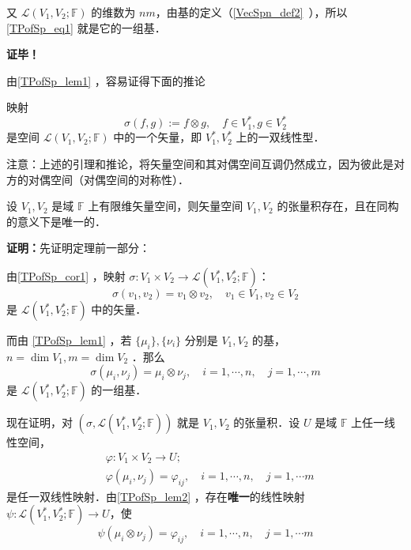 又 $\mathcal L(V_1,V_2;\mathbb F)$ 的维数为 $nm$，由基的定义（\autoref{VecSpn_def2}~），所以\autoref{TPofSp_eq1} 就是它的一组基．

\textbf{证毕！}

由\autoref{TPofSp_lem1} ，容易证得下面的推论
\begin{corollary}{}\label{TPofSp_cor1}
映射
\begin{equation}
\sigma(f,g):=f\otimes g,\quad f\in V_1^*,g\in V_2^*
\end{equation}
是空间 $\mathcal L(V_1,V_2;\mathbb F)$ 中的一个矢量，即 $V_1^*,V_2^*$ 上的一双线性型．
\end{corollary}
注意：上述的引理和推论，将矢量空间和其对偶空间互调仍然成立，因为彼此是对方的对偶空间（对偶空间的对称性）．

\begin{theorem}{}
设 $V_1,V_2$ 是域 $\mathbb F$ 上有限维矢量空间，则矢量空间 $V_1,V_2$ 的张量积存在，且在同构的意义下是唯一的．
\end{theorem}
\textbf{证明：}先证明定理前一部分：

由\autoref{TPofSp_cor1} ，映射 $\sigma:V_1\times V_2\rightarrow\mathcal L(V_1^*,V_2^*;\mathbb F) $：
\begin{equation}\label{TPofSp_eq7}
\sigma(v_1,v_2)=v_1\otimes v_2,\quad v_1\in V_1,v_2\in V_2 
\end{equation}
是  $\mathcal L(V_1^*,V_2^*;\mathbb F)$ 中的矢量．

而由 \autoref{TPofSp_lem1} ，若 $\{\mu_i\},\{\nu_i\}$ 分别是 $V_1,V_2$ 的基，$n=\dim V_1,m=\dim V_2$ ．那么
\begin{equation}\label{TPofSp_eq2}
\sigma(\mu_i,\nu_j)=\mu_i\otimes \nu_j,\quad i=1,\cdots,n,\quad j=1,\cdots,m
\end{equation}
是 $\mathcal L(V_1^*,V_2^*;\mathbb F)$ 的一组基．

现在证明，对 $(\sigma,\mathcal L(V_1^*,V_2^*;\mathbb F))$ 就是 $V_1,V_2$ 的张量积．设 $U$ 是域 $\mathbb F$ 上任一线性空间，
\begin{equation}\label{TPofSp_eq3}
\begin{aligned}
&\varphi:V_1\times V_2\rightarrow U;\\
&\varphi(\mu_i,\nu_j)=\varphi_{ij},\quad i=1,\cdots,n,\quad j=1,\cdots m
\end{aligned}
\end{equation}
是任一双线性映射．由\autoref{TPofSp_lem2} ，存在\textbf{唯一}的线性映射 $\psi:\mathcal L(V_1^*,V_2^*;\mathbb F)\rightarrow U$，使
\begin{equation}\label{TPofSp_eq4}
\psi(\mu_i\otimes \nu_j)=\varphi_{ij},\quad i=1,\cdots,n,\quad j=1,\cdots m
\end{equation}


